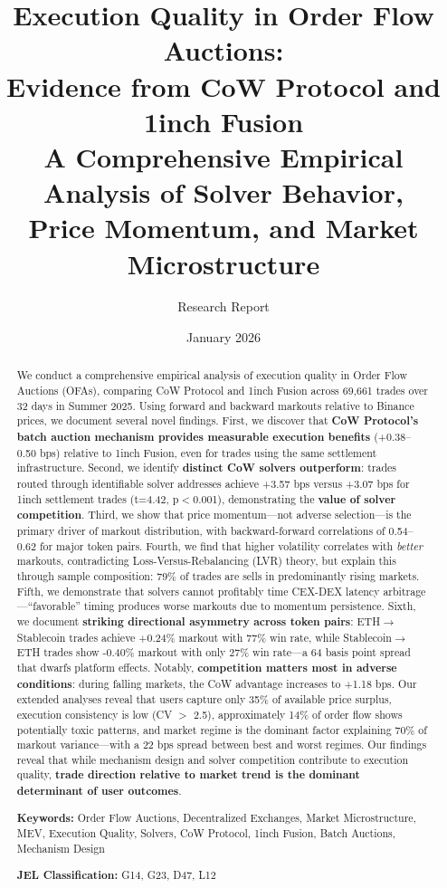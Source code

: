 \documentclass[12pt,a4paper]{article}
\title{\textbf{Execution Quality in Order Flow Auctions: \\
Evidence from CoW Protocol and 1inch Fusion}\\[1em]
\large A Comprehensive Empirical Analysis of Solver Behavior, \\
Price Momentum, and Market Microstructure}
\author{Research Report}
\date{January 2026}
\begin{document}
\maketitle

\begin{abstract}
We conduct a comprehensive empirical analysis of execution quality in Order Flow Auctions (OFAs), comparing CoW Protocol and 1inch Fusion across 69,661 trades over 32 days in Summer 2025. Using forward and backward markouts relative to Binance prices, we document several novel findings. First, we discover that \textbf{CoW Protocol's batch auction mechanism provides measurable execution benefits} (+0.38--0.50 bps) relative to 1inch Fusion, even for trades using the same settlement infrastructure. Second, we identify \textbf{distinct CoW solvers outperform}: trades routed through identifiable solver addresses achieve +3.57 bps versus +3.07 bps for 1inch settlement trades (t=4.42, p$<$0.001), demonstrating the \textbf{value of solver competition}. Third, we show that price momentum---not adverse selection---is the primary driver of markout distribution, with backward-forward correlations of 0.54--0.62 for major token pairs. Fourth, we find that higher volatility correlates with \textit{better} markouts, contradicting Loss-Versus-Rebalancing (LVR) theory, but explain this through sample composition: 79\% of trades are sells in predominantly rising markets. Fifth, we demonstrate that solvers cannot profitably time CEX-DEX latency arbitrage---``favorable'' timing produces worse markouts due to momentum persistence. Sixth, we document \textbf{striking directional asymmetry across token pairs}: ETH$\rightarrow$Stablecoin trades achieve +0.24\% markout with 77\% win rate, while Stablecoin$\rightarrow$ETH trades show -0.40\% markout with only 27\% win rate---a 64 basis point spread that dwarfs platform effects. Notably, \textbf{competition matters most in adverse conditions}: during falling markets, the CoW advantage increases to +1.18 bps. Our extended analyses reveal that users capture only 35\% of available price surplus, execution consistency is low (CV $>$ 2.5), approximately 14\% of order flow shows potentially toxic patterns, and market regime is the dominant factor explaining 70\% of markout variance---with a 22 bps spread between best and worst regimes. Our findings reveal that while mechanism design and solver competition contribute to execution quality, \textbf{trade direction relative to market trend is the dominant determinant of user outcomes}.

\vspace{1em}
\noindent\textbf{Keywords:} Order Flow Auctions, Decentralized Exchanges, Market Microstructure, MEV, Execution Quality, Solvers, CoW Protocol, 1inch Fusion, Batch Auctions, Mechanism Design

\vspace{1em}
\noindent\textbf{JEL Classification:} G14, G23, D47, L12
\end{abstract}
\end{document}
